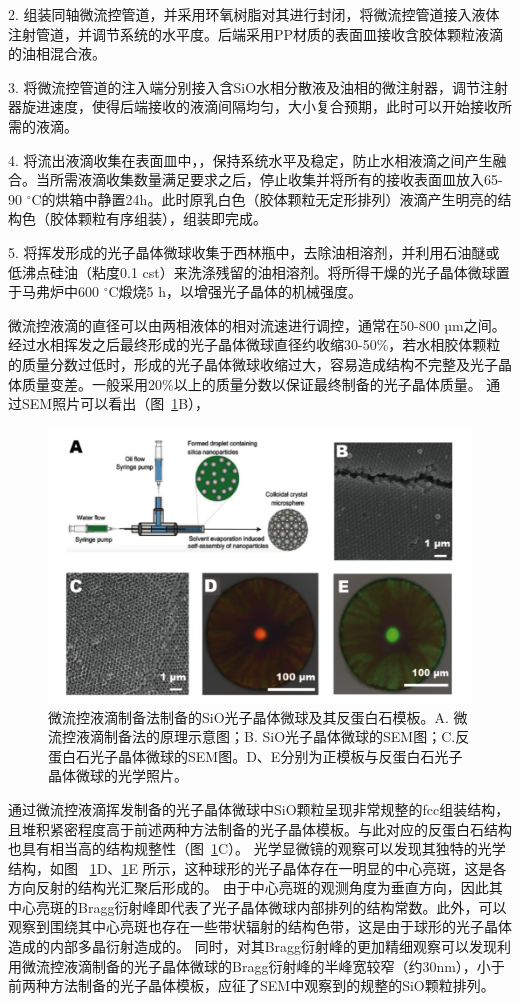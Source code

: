 2. 组装同轴微流控管道，并采用环氧树脂对其进行封闭，将微流控管道接入液体注射管道，并调节系统的水平度。后端采用PP材质的表面皿接收含胶体颗粒液滴的油相混合液。

3. 将微流控管道的注入端分别接入含SiO水相分散液及油相的微注射器，调节注射器旋进速度，使得后端接收的液滴间隔均匀，大小复合预期，此时可以开始接收所需的液滴。

4. 将流出液滴收集在表面皿中，，保持系统水平及稳定，防止水相液滴之间产生融合。当所需液滴收集数量满足要求之后，停止收集并将所有的接收表面皿放入65-90 $^{\circ}$C的烘箱中静置24h。此时原乳白色（胶体颗粒无定形排列）液滴产生明亮的结构色（胶体颗粒有序组装），组装即完成。

5. 将挥发形成的光子晶体微球收集于西林瓶中，去除油相溶剂，并利用石油醚或低沸点硅油（粘度0.1 cst）来洗涤残留的油相溶剂。将所得干燥的光子晶体微球置于马弗炉中600 $^{\circ}$C煅烧5 h，以增强光子晶体的机械强度。

微流控液滴的直径可以由两相液体的相对流速进行调控，通常在50-800 µm之间。经过水相挥发之后最终形成的光子晶体微球直径约收缩30-50\%，若水相胶体颗粒的质量分数过低时，形成的光子晶体微球收缩过大，容易造成结构不完整及光子晶体质量变差。一般采用20\%以上的质量分数以保证最终制备的光子晶体质量。
通过SEM照片可以看出（图~\ref{fig:ch2-CCB}B），
\begin{figure}[htbp]
  \centering
  \includegraphics[width=\linewidth]{figures/ch2/CCB.png}
  \caption{微流控液滴制备法制备的SiO光子晶体微球及其反蛋白石模板。A. 微流控液滴制备法的原理示意图；B. SiO光子晶体微球的SEM图；C.反蛋白石光子晶体微球的SEM图。D、E分别为正模板与反蛋白石光子晶体微球的光学照片。}
  \label{fig:ch2-CCB}
\end{figure}
通过微流控液滴挥发制备的光子晶体微球中SiO颗粒呈现非常规整的fcc组装结构，且堆积紧密程度高于前述两种方法制备的光子晶体模板。与此对应的反蛋白石结构也具有相当高的结构规整性（图~\ref{fig:ch2-CCB}C）。
光学显微镜的观察可以发现其独特的光学结构，如图
  ~\ref{fig:ch2-CCB}D、\ref{fig:ch2-CCB}E
所示，这种球形的光子晶体存在一明显的中心亮斑，这是各方向反射的结构光汇聚后形成的。
由于中心亮斑的观测角度为垂直方向，因此其中心亮斑的Bragg衍射峰即代表了光子晶体微球内部排列的结构常数。此外，可以观察到围绕其中心亮斑也存在一些带状辐射的结构色带，这是由于球形的光子晶体造成的内部多晶衍射造成的。
同时，对其Bragg衍射峰的更加精细观察可以发现利用微流控液滴制备的光子晶体微球的Bragg衍射峰的半峰宽较窄（约30nm），小于前两种方法制备的光子晶体模板，应征了SEM中观察到的规整的SiO颗粒排列。

